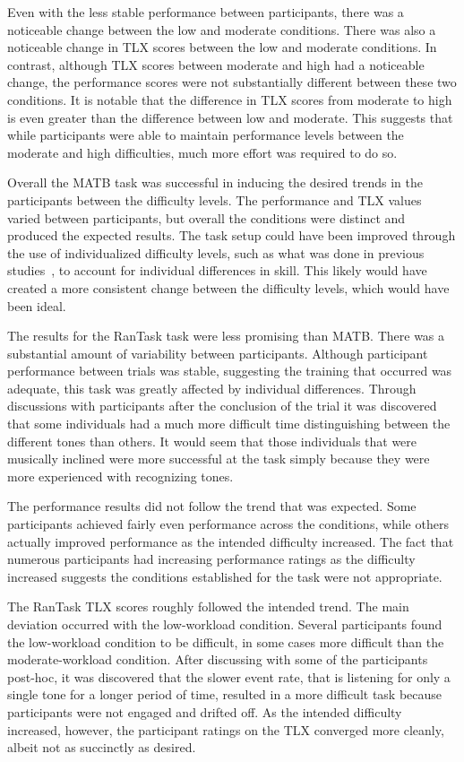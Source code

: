 \documentclass[11pt]{article}
\begin{document}
	Even with the less stable performance between participants, there was a noticeable change between the low and moderate conditions. There was also a noticeable change in TLX scores between the low and moderate conditions. In contrast, although TLX scores between moderate and high had a noticeable change, the performance scores were not substantially different between these two conditions. It is notable that the difference in TLX scores from moderate to high is even greater than the difference between low and moderate. This suggests that while participants were able to maintain performance levels between the moderate and high difficulties, much more effort was required to do so. 
	
	Overall the MATB task was successful in inducing the desired trends in the participants between the difficulty levels. The performance and TLX values varied between participants, but overall the conditions were distinct and produced the expected results. The task setup could have been improved through the use of individualized difficulty levels, such as what was done in previous studies~\cite{Estepp_2015}, to account for individual differences in skill. This likely would have created a more consistent change between the difficulty levels, which would have been ideal.
	
	The results for the RanTask task were less promising than MATB. There was a substantial amount of variability between participants. Although participant performance between trials was stable, suggesting the training that occurred was adequate, this task was greatly affected by individual differences. Through discussions with participants after the conclusion of the trial it was discovered that some individuals had a much more difficult time distinguishing between the different tones than others. It would seem that those individuals that were musically inclined were more successful at the task simply because they were more experienced with recognizing tones. 
	
	The performance results did not follow the trend that was expected. Some participants achieved fairly even performance across the conditions, while others actually improved performance as the intended difficulty increased. The fact that numerous participants had increasing performance ratings as the difficulty increased suggests the conditions established for the task were not appropriate. 
		
	The RanTask TLX scores roughly followed the intended trend. The main deviation occurred with the low-workload condition. Several participants found the low-workload condition to be difficult, in some cases more difficult than the moderate-workload condition. After discussing with some of the participants post-hoc, it was discovered that the slower event rate, that is listening for only a single tone for a longer period of time, resulted in a more difficult task because participants were not engaged and drifted off.  As the intended difficulty increased, however, the participant ratings on the TLX converged more cleanly, albeit not as succinctly as desired.
\end{document}
